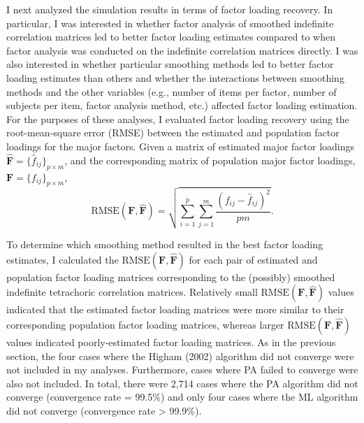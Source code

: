 \documentclass[
  english,
  man]{apa6}
\begin{document}
I next analyzed the simulation results in terms of factor loading recovery. In particular, I was interested in whether factor analysis of smoothed indefinite correlation matrices led to better factor loading estimates compared to when factor analysis was conducted on the indefinite correlation matrices directly. I was also interested in whether particular smoothing methods led to better factor loading estimates than others and whether the interactions between smoothing methods and the other variables (e.g., number of items per factor, number of subjects per item, factor analysis method, etc.) affected factor loading estimation. For the purposes of these analyses, I evaluated factor loading recovery using the root-mean-square error (RMSE) between the estimated and population factor loadings for the major factors. Given a matrix of estimated major factor loadings \(\hat{\mathbf{F}} = \{ \hat{f}_{ij} \}_{p \times m}\), and the corresponding matrix of population major factor loadings, \(\mathbf{F} = \{ f_{ij} \}_{p \times m}\),
\begin{equation}
\textrm{RMSE}(\mathbf{F}, \hat{\mathbf{F}}) = \sqrt{\sum_{i = 1}^{p} \sum_{j = 1}^{m} \frac{(f_{ij} - \hat{f}_{ij})^2}{pm}}.
\label{eq:rmse}
\end{equation}

To determine which smoothing method resulted in the best factor loading estimates, I calculated the \(\textrm{RMSE}(\mathbf{F}, \hat{\mathbf{F}})\) for each pair of estimated and population factor loading matrices corresponding to the (possibly) smoothed indefinite tetrachoric correlation matrices. Relatively small \(\textrm{RMSE}(\mathbf{F}, \hat{\mathbf{F}})\) values indicated that the estimated factor loading matrices were more similar to their corresponding population factor loading matrices, whereas larger \(\textrm{RMSE}(\mathbf{F}, \hat{\mathbf{F}})\) values indicated poorly-estimated factor loading matrices. As in the previous section, the four cases where the Higham (2002) algorithm did not converge were not included in my analyses. Furthermore, cases where PA failed to converge were also not included. In total, there were 2,714 cases where the PA algorithm did not converge (convergence rate = 99.5\%) and only four cases where the ML algorithm did not converge (convergence rate \textgreater{} 99.9\%).
\end{document}
